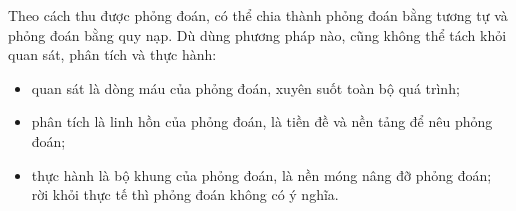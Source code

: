 \documentclass[11pt]{article}
\begin{document}
Theo cách thu được phỏng đoán, có thể chia thành phỏng đoán bằng tương tự và
phỏng đoán bằng quy nạp. Dù dùng phương pháp nào, cũng không thể tách khỏi
quan sát, phân tích và thực hành:
\begin{itemize}
  \item quan sát là dòng máu của phỏng đoán, xuyên suốt toàn bộ quá trình;
  \item phân tích là linh hồn của phỏng đoán, là tiền đề và nền tảng để nêu
  phỏng đoán;
  \item thực hành là bộ khung của phỏng đoán, là nền móng nâng đỡ phỏng đoán;
  rời khỏi thực tế thì phỏng đoán không có ý nghĩa.
\end{itemize}
\end{document}
